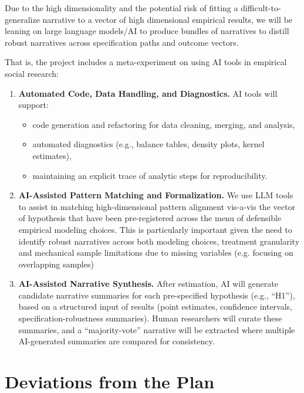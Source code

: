 \documentclass[12pt]{article}
\begin{document}
Due to the high dimensionality and the potential risk of fitting a difficult-to-generalize narrative to a vector of high dimensional empirical results, we will be leaning on large language models/AI to produce bundles of narratives to distill robust narratives across specification paths and outcome vectors.

That is, the project includes a meta-experiment on using AI tools in empirical social research:

\begin{enumerate}

    \item \textbf{Automated Code, Data Handling, and Diagnostics.} 
    AI tools will support:
    \begin{itemize}
        \item code generation and refactoring for data cleaning, merging, and analysis,
        \item automated diagnostics (e.g., balance tables, density plots, kernel estimates),
        \item maintaining an explicit trace of analytic steps for reproducibility.
    \end{itemize}

    \item \textbf{AI-Assisted Pattern Matching and Formalization.} 
    We use LLM tools to assist in matching high-dimensional pattern alignment vis-a-vis the vector of hypothesis that have been pre-registered across the menu of defensible empirical modeling choices. This is particularly important given the need to identify robust narratives across both modeling choices, treatment granularity and mechanical sample limitations due to missing variables (e.g. focusing on overlapping samples)
    
    \item \textbf{AI-Assisted Narrative Synthesis.} 
    After estimation, AI will generate candidate narrative summaries for each pre-specified hypothesis (e.g., ``H1''), based on a structured input of results (point estimates, confidence intervals, specification-robustness summaries). Human researchers will curate these summaries, and a ``majority-vote'' narrative will be extracted where multiple AI-generated summaries are compared for consistency. 

\end{enumerate}




\section{Deviations from the Plan}
\end{document}
